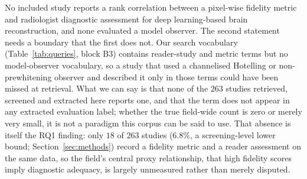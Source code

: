 \documentclass[review,authoryear]{elsarticle}
\begin{document}
No included study reports a rank correlation between a pixel-wise fidelity metric and
radiologist diagnostic assessment for deep learning-based brain reconstruction, and none
evaluated a model observer. The second statement needs a boundary that the first does
not. Our search vocabulary (Table~\ref{tab:queries}, block B3) contains reader-study and
metric terms but no model-observer vocabulary, so a study that used a channelised
Hotelling or non-prewhitening observer and described it only in those terms could have
been missed at retrieval. What we can say is that none of the $263$ studies retrieved,
screened and extracted here reports one, and that the term does not appear in any
extracted evaluation label; whether the true field-wide count is zero or merely very
small, it is not a paradigm this corpus can be said to use. That absence is itself the RQ1 finding: only $18$ of
$263$ studies ($6.8\%$, a screening-level lower bound; Section~\ref{sec:methods})
record a fidelity metric and a reader assessment on the same data, so the field's
central proxy relationship, that high fidelity scores imply diagnostic adequacy, is
largely unmeasured rather than merely disputed.
\end{document}
